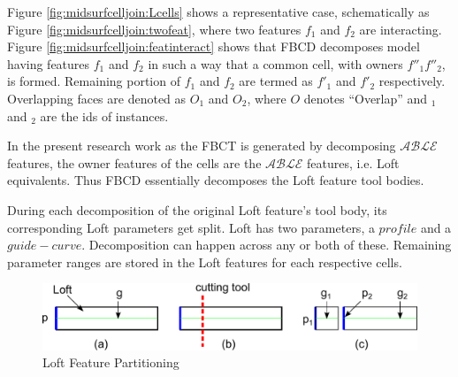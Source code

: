 Figure \ref{fig:midsurfcelljoin:Lcells} shows a representative case, schematically as Figure \ref{fig:midsurfcelljoin:twofeat}, where two features $f_1$ and $f_2$ are interacting. 
Figure \ref{fig:midsurfcelljoin:featinteract} shows that FBCD decomposes model having features $f_1$ and $f_2$ in such a way that a common cell, with owners $f''_1f''_2$, is formed. Remaining portion of $f_1$ and $f_2$ are termed as $f'_1$ and $f'_2$ respectively.  Overlapping faces are denoted as $O_1$ and $O_2$, where $O$ denotes ``Overlap'' and $_1$ and $_2$ are the ids of instances. 

In the present research work as the FBCT is generated by decomposing $\mathcal{ABLE}$ features, the owner features of the cells are the $\mathcal{ABLE}$ features, i.e. Loft equivalents. Thus FBCD essentially decomposes the Loft feature tool bodies.

During each decomposition of the original Loft feature's tool body, its corresponding Loft parameters get split. Loft has two parameters, a $profile$ and a $guide-curve$. Decomposition can happen across any or both of these. Remaining parameter ranges are stored in the Loft features for each respective cells.



  \begin{figure}[!h]
\centering     %
\includegraphics[width=0.75\linewidth,valign=t]{images/loftbeforecdsweep}
\caption{Loft Feature Partitioning}
\label{fig:midsurfcelljoin:loftbeforecdsweep}
\end{figure}

